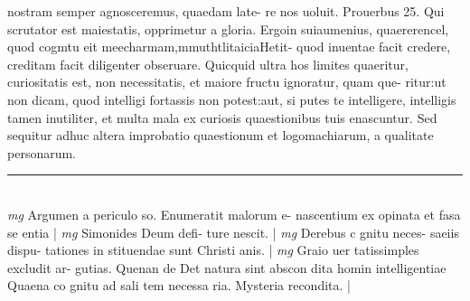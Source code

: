 \documentclass{article}
\begin{document}
\begin{pages}
nostram semper agnosceremus, quaedam late- re nos uoluit. Prouerbus 25. Qui scrutator est maiestatis, opprimetur a gloria. Ergoin suiaumenius, quaererencel, quod cogmtu eit meecharmam,mmuthtlitaiciaHetit- quod inuentae facit credere, creditam facit diligenter obseruare. Quicquid ultra hos limites quaeritur, curiositatis est, non necessitatis, et maiore fructu ignoratur, quam que- ritur:ut non dicam, quod intelligi fortassis non potest:aut, si putes te intelligere, intelligis tamen inutiliter, et multa mala ex curiosis quaestionibus tuis enascuntur. Sed sequitur adhuc altera improbatio quaestionum et logomachiarum, a qualitate personarum.  \pend
\vspace{0.5cm}\noindent
\vspace{0.2cm}\rule{1cm}{0.2pt}\\ 
\hspace{0.2cm}\textit{mg}
\footnotesize Argumen a periculo so. Enumeratit malorum e- nascentium ex opinata et fasa se entia 
\normalsize| 
\hspace{0.2cm}\textit{mg}
\footnotesize Simonides Deum defi- ture nescit. 
\normalsize| 
\hspace{0.2cm}\textit{mg}
\footnotesize Derebus c gnitu neces- saeiis dispu- tationes in stituendae sunt Christi anis. 
\normalsize| 
\hspace{0.2cm}\textit{mg}
\footnotesize Graio uer tatissimples excludit ar- gutias. Quenan de Det natura sint abscon dita homin intelligentiae Quaena co gnitu ad sali tem necessa ria. Mysteria recondita. 
\normalsize| 

\end{pages}
\end{document}
